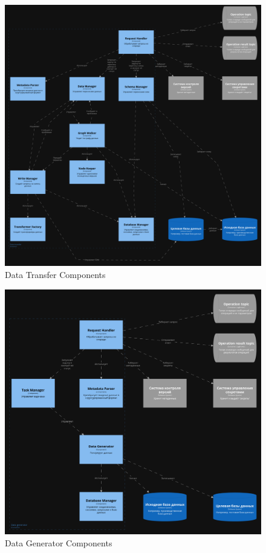\begin{figure}
  \includegraphics[scale=0.15]{./img/structurizr-DataTransferComponents.png}
  \caption{Data Transfer Components}
  \label{data-transfer-components}
\end{figure}

\begin{figure}
  \includegraphics[scale=0.15]{./img/structurizr-DataGeneratorComponents.png}
  \caption{Data Generator Components}
  \label{data-generator-components}
\end{figure}

